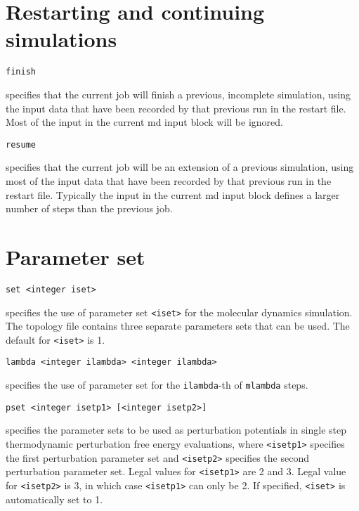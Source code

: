 \section{Restarting and continuing simulations}
\begin{description}
\item
\begin{verbatim}
finish
\end{verbatim}
specifies that the current job will finish a previous, incomplete
simulation, using the input data that have been recorded by that
previous run in the restart file. Most of the input in the current
md input block will be ignored.

\item
\begin{verbatim}
resume
\end{verbatim}
specifies that the current job will be an extension of a previous
simulation, using most of the  input data that have been recorded by that
previous run in the restart file. Typically the input in the current
md input block defines a larger number of steps than the previous job.

\section{Parameter set}

\item
\begin{verbatim}
set <integer iset>
\end{verbatim}
specifies the use of parameter set \verb+<iset>+ for the 
molecular dynamics simulation. 
The topology file contains three separate parameters sets that can 
be used. The default for \verb+<iset>+ is 1.

\item
\begin{verbatim}
lambda <integer ilambda> <integer ilambda>
\end{verbatim}
specifies the use of parameter set for the \verb+ilambda+-th
of \verb+mlambda+ steps.

\item
\begin{verbatim}
pset <integer isetp1> [<integer isetp2>]
\end{verbatim}
specifies the parameter sets to be used as perturbation potentials
in single step thermodynamic perturbation free energy evaluations,
where \verb+<isetp1>+ specifies the first perturbation parameter set and
\verb+<isetp2>+ specifies the second perturbation parameter set. Legal
values for \verb+<isetp1>+ are 2 and 3. Legal value for \verb+<isetp2>+ is
3, in which case \verb+<isetp1>+ can only be 2. If specified, \verb+<iset>+
is automatically set to 1.


\end{description}
